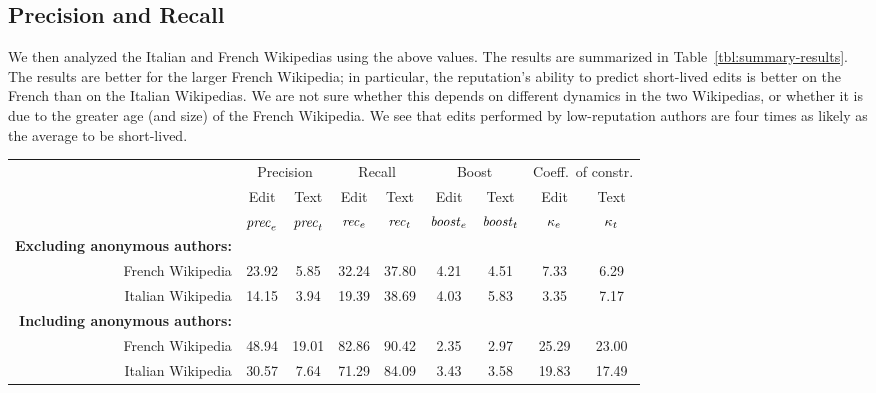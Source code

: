 \subsection{Precision and Recall}

We then analyzed the Italian and French Wikipedias using the above
values. 
The results are summarized in Table~\ref{tbl:summary-results}. 
The results are better for the larger French Wikipedia; in particular,
the reputation's ability to predict short-lived edits is better on the
French than on the Italian Wikipedias. 
We are not sure whether this depends on different dynamics in the two
Wikipedias, or whether it is due to the greater age (and size) of the
French Wikipedia.
We see that edits performed by low-reputation authors are four times
as likely as the average to be short-lived. 

\begin{sidewaystable}[tp]
\begin{center}
\begin{tabular}{|r||c|c||c|c||c|c||c|c|} \hline
 & \multicolumn{2}{|c||}{Precision}
 & \multicolumn{2}{|c||}{Recall}
 & \multicolumn{2}{|c||}{Boost}
 & \multicolumn{2}{|c|}{Coeff.\ of constr.} \\
 & Edit & Text & Edit & Text  & Edit & Text & Edit & Text \\
 & ${\text{\textit{prec}}}_e$ & ${\text{\textit{prec}}}_t$ & ${\text{\textit{rec}}}_e$ & ${\text{\textit{rec}}}_t$ & ${\text{\textit{boost}}}_e$ & ${\text{\textit{boost}}}_t$ 
 & $\kappa_e$ & $\kappa_t$ \\[0.5ex] \hline 
\textbf{Excluding anonymous authors: \quad} & & & & & & & & \\
\qquad French Wikipedia          & 23.92 &  5.85 & 32.24 & 37.80 & 4.21 & 4.51 &  7.33 &  6.29 \\
\qquad Italian Wikipedia         & 14.15 &  3.94 & 19.39 & 38.69 & 4.03 & 5.83 &  3.35 &  7.17 \\ \hline
\textbf{Including anonymous authors: \quad} & & & & & & & & \\
\qquad French Wikipedia          & 48.94 & 19.01 & 82.86 & 90.42 & 2.35 & 2.97 & 25.29 & 23.00 \\
\qquad Italian Wikipedia         & 30.57 &  7.64 & 71.29 & 84.09 & 3.43 & 3.58 & 19.83 & 17.49 \\ \hline
\end{tabular}
\end{center}
\caption{Summary of the performance of content-driven reputation over
the Italian and French Wikipedias. All data are expressed as percentages.}
\label{tbl:summary-results}
\end{sidewaystable}


